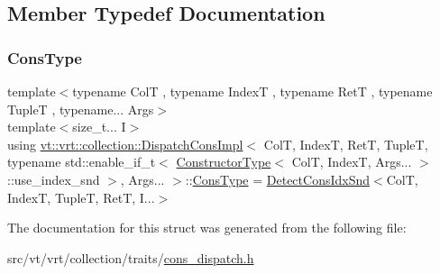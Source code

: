 \subsection{Member Typedef Documentation}
\mbox{\label{structvt_1_1vrt_1_1collection_1_1_dispatch_cons_impl_3_01_col_t_00_01_index_t_00_01_ret_t_00_01_dd689f23c5fa7346ae8a5efd9cf9f29e_ab72c81bd39a0f6108587fb423ce22512}} 
\subsubsection{\texorpdfstring{Cons\+Type}{ConsType}}
{\footnotesize\ttfamily template$<$typename ColT , typename IndexT , typename RetT , typename TupleT , typename... Args$>$ \\
template$<$size\+\_\+t... I$>$ \\
using \hyperlink{structvt_1_1vrt_1_1collection_1_1_dispatch_cons_impl}{vt\+::vrt\+::collection\+::\+Dispatch\+Cons\+Impl}$<$ ColT, IndexT, RetT, TupleT, typename std\+::enable\+\_\+if\+\_\+t$<$ \hyperlink{structvt_1_1vrt_1_1collection_1_1_constructor_type}{Constructor\+Type}$<$ ColT, IndexT, Args... $>$\+::use\+\_\+index\+\_\+snd $>$, Args... $>$\+::\hyperlink{structvt_1_1vrt_1_1collection_1_1_dispatch_cons_impl_3_01_col_t_00_01_index_t_00_01_ret_t_00_01_dd689f23c5fa7346ae8a5efd9cf9f29e_ab72c81bd39a0f6108587fb423ce22512}{Cons\+Type} =  \hyperlink{structvt_1_1vrt_1_1collection_1_1_detect_cons_idx_snd}{Detect\+Cons\+Idx\+Snd}$<$ColT, IndexT, TupleT, RetT, I...$>$}



The documentation for this struct was generated from the following file\+:\begin{DoxyCompactItemize}
\item 
src/vt/vrt/collection/traits/\hyperlink{cons__dispatch_8h}{cons\+\_\+dispatch.\+h}\end{DoxyCompactItemize}
